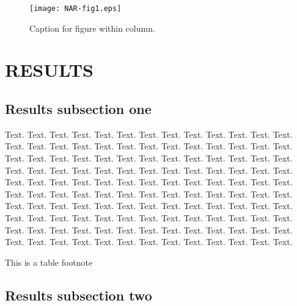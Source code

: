 \documentclass[a4,center,fleqn]{NAR}
\begin{document}
\begin{figure}[t]
\begin{center}
\texttt{[image: NAR-fig1.eps]}
\end{center}
\caption{Caption for figure within column.}
\label{NAR-fig1}
\end{figure}


\section{RESULTS}

\subsection{Results subsection one}

Text. Text. Text. Text. Text. Text. Text. Text. Text. Text. Text.
Text. Text. Text. Text. Text. Text. Text. Text. Text. Text. Text.
Text. Text. Text. Text. Text. Text. Text. Text. Text. Text. Text.
Text. Text. Text. Text. Text. Text. Text. Text. Text. Text. Text.
Text. Text. Text. Text. Text. Text. Text. Text. Text. Text. Text.
Text. Text. Text. Text. Text. Text. Text. Text. Text. Text. Text.
Text. Text. Text. Text. Text. Text. Text. Text. Text. Text. Text.
Text. Text. Text. Text. Text. Text. Text. Text. Text. Text. Text.
Text. Text. Text. Text. Text. Text. Text. Text. Text. Text. Text.
Text. Text. Text. Text. Text. Text. Text. Text. Text. Text. Text.
Text. Text. Text. Text. Text. Text. Text. Text. Text. Text. Text.
Text. Text. Text. Text. Text. Text. Text. Text. Text.

\begin{table}[b]
{This is a table footnote}
\end{table}


\subsection{Results subsection two}
\end{document}
